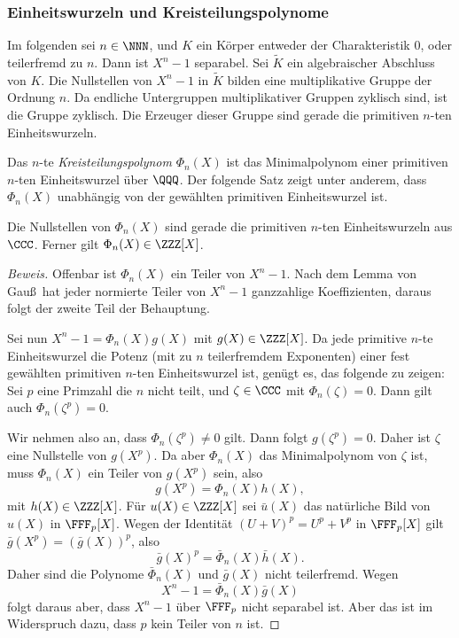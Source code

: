 \documentclass[12pt,a4paper,twoside]{article}
\newcommand{\ei}[1]{\emph{#1}\index{#1}}
\begin{document}
\subsubsection{Einheitswurzeln und Kreisteilungspolynome}
Im folgenden sei $n\in\NNN$, und $K$ ein K\"orper entweder der Charakteristik
$0$, oder teilerfremd zu $n$. Dann ist $X^n-1$ separabel. Sei $\tilde K$ ein
algebraischer Abschluss von $K$. Die Nullstellen von $X^n-1$ in $\tilde K$
bilden eine multiplikative Gruppe der Ordnung $n$. Da endliche Untergruppen
multiplikativer Gruppen zyklisch sind, ist die Gruppe zyklisch. Die Erzeuger
dieser Gruppe sind gerade die primitiven $n$-ten Einheitswurzeln.

Das $n$-te \ei{Kreisteilungspolynom} $\Phi_n(X)$ ist das Minimalpolynom einer
primitiven $n$-ten Einheitswurzel \"uber $\QQQ$. Der folgende Satz zeigt unter
anderem, dass $\Phi_n(X)$ unabh\"angig von der gew\"ahlten primitiven
Einheitswurzel ist.
\begin{Satz}
  Die Nullstellen von $\Phi_n(X)$ sind gerade die primitiven $n$-ten
  Einheitswurzeln aus $\CCC$. Ferner gilt $\Phi_n(X)\in\ZZZ[X]$.
\end{Satz}
\begin{proof}[Beweis]
  Offenbar ist $\Phi_n(X)$ ein Teiler von $X^n-1$. Nach dem Lemma von Gau\ss\
  hat jeder normierte Teiler von $X^n-1$ ganzzahlige Koeffizienten, daraus
  folgt der zweite Teil der Behauptung.
  
  Sei nun $X^n-1=\Phi_n(X)g(X)$ mit $g(X)\in\ZZZ[X]$. Da jede primitive $n$-te
  Einheitswurzel die Potenz (mit zu $n$ teilerfremdem Exponenten) einer fest
  gew\"ahlten primitiven $n$-ten Einheitswurzel ist, gen\"ugt es, das folgende
  zu zeigen: Sei $p$ eine Primzahl die $n$ nicht teilt, und $\zeta\in\CCC$ mit
  $\Phi_n(\zeta)=0$. Dann gilt auch $\Phi_n(\zeta^p)=0$.

Wir nehmen also an, dass $\Phi_n(\zeta^p)\ne0$ gilt. Dann folgt
$g(\zeta^p)=0$. Daher ist $\zeta$ eine Nullstelle von $g(X^p)$. Da aber
$\Phi_n(X)$ das Minimalpolynom von $\zeta$ ist, muss $\Phi_n(X)$ ein Teiler
von $g(X^p)$ sein, also
\[
g(X^p)=\Phi_n(X)h(X),
\]
mit $h(X)\in\ZZZ[X]$. F\"ur $u(X)\in\ZZZ[X]$ sei $\bar u(X)$ das
nat\"urliche Bild von $u(X)$ in $\FFF_p[X]$. Wegen der Identit\"at
$(U+V)^p=U^p+V^p$ in $\FFF_p[X]$ gilt $\bar g(X^p)=(\bar g(X))^p$, also
\[
\bar g(X)^p=\bar\Phi_n(X)\bar h(X).
\]
Daher sind die Polynome $\bar\Phi_n(X)$ und $\bar g(X)$ nicht
teilerfremd. Wegen
\[
X^n-1=\bar\Phi_n(X)\bar g(X)
\]
folgt daraus aber, dass $X^n-1$ \"uber $\FFF_p$ nicht separabel ist. Aber das
ist im Widerspruch dazu, dass $p$ kein Teiler von $n$ ist.
\end{proof}
\end{document}
